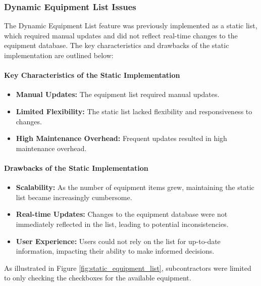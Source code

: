 \subsubsection{Dynamic Equipment List Issues}
The Dynamic Equipment List feature was previously implemented as a static list, which required manual updates and did not reflect real-time changes to the equipment database. The key characteristics and drawbacks of the static implementation are outlined below:

\paragraph{Key Characteristics of the Static Implementation}
\begin{itemize}
    \item \textbf{Manual Updates:} The equipment list required manual updates.
    \item \textbf{Limited Flexibility:} The static list lacked flexibility and responsiveness to changes.
    \item \textbf{High Maintenance Overhead:} Frequent updates resulted in high maintenance overhead.
\end{itemize}

\paragraph{Drawbacks of the Static Implementation}
\begin{itemize}
    \item \textbf{Scalability:} As the number of equipment items grew, maintaining the static list became increasingly cumbersome.
    \item \textbf{Real-time Updates:} Changes to the equipment database were not immediately reflected in the list, leading to potential inconsistencies.
    \item \textbf{User Experience:} Users could not rely on the list for up-to-date information, impacting their ability to make informed decisions.
\end{itemize}

As illustrated in Figure \ref{fig:static_equipment_list}, subcontractors were limited to only checking the checkboxes for the available equipment.

